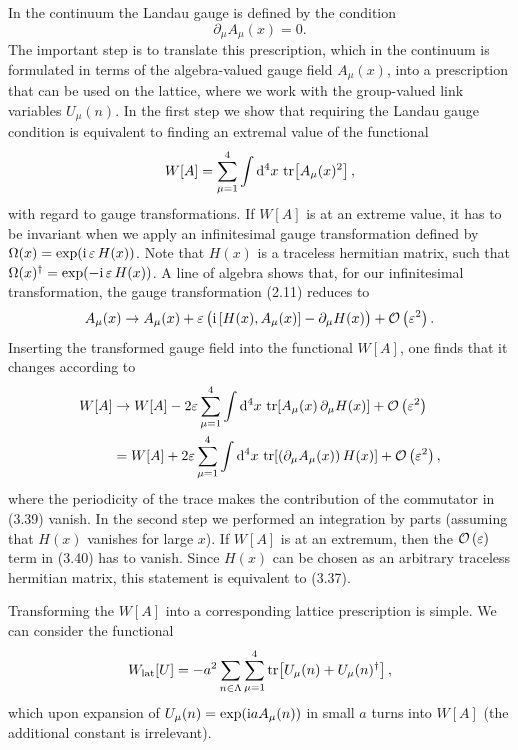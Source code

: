 In the continuum the Landau gauge is defined by the condition
\begin{equation}
  \partial_\mu A_\mu(x) = 0 .
\end{equation}
The important step is to translate this prescription, which in the continuum is
formulated in terms of the algebra-valued gauge field $A_\mu(x)$, into a
prescription that can be used on the lattice, where we work with the
group-valued link variables $U_\mu(n)$. In the first step we show that
requiring the Landau gauge condition is equivalent to finding an extremal value
of the functional
\begin{equation}
  W[A] = \sum_{\mu=1}^{4}\int \mathrm{d}^4 x\, \operatorname{tr}\!\left[A_\mu(x)^2\right] ,
\end{equation}
with regard to gauge transformations. If $W[A]$ is at an extreme value, it has
to be invariant when we apply an infinitesimal gauge transformation defined by
$\Omega(x) = \exp(\mathrm{i}\,\varepsilon\, H(x))$. Note that $H(x)$ is a traceless
hermitian matrix, such that $\Omega(x)^\dagger = \exp(-\mathrm{i}\,\varepsilon\,
H(x))$. A line of algebra shows that, for our infinitesimal transformation, the
gauge transformation (2.11) reduces to
\begin{equation}
  A_\mu(x) \to A_\mu(x) + \varepsilon\,\big(\mathrm{i}\,[H(x), A_\mu(x)] - \partial_\mu H(x)\big) + \mathcal{O}\left(\varepsilon^2\right) .
\end{equation}
Inserting the transformed gauge field into the functional $W[A]$, one finds
that it changes according to
\begin{equation}
\begin{split}
  W[A] &\to W[A] - 2\varepsilon\sum_{\mu=1}^{4}\int \mathrm{d}^4 x\,
    \operatorname{tr}\!\left[A_\mu(x)\,\partial_\mu H(x)\right] + \mathcal{O}\left(\varepsilon^2\right) \\
  &= W[A] + 2\varepsilon\sum_{\mu=1}^{4}\int \mathrm{d}^4 x\,
    \operatorname{tr}\!\left[(\partial_\mu A_\mu(x))\, H(x)\right] + \mathcal{O}\left(\varepsilon^2\right) ,
\end{split}
\end{equation}
where the periodicity of the trace makes the contribution of the commutator in
(3.39) vanish. In the second step we performed an integration by parts
(assuming that $H(x)$ vanishes for large $x$). If $W[A]$ is at an extremum, then
the $\mathcal{O}\left(\varepsilon\right)$ term in (3.40) has to vanish. Since $H(x)$ can be
chosen as an arbitrary traceless hermitian matrix, this statement is equivalent
to (3.37).

Transforming the $W[A]$ into a corresponding lattice prescription is simple. We
can consider the functional
\begin{equation}
  W_{\mathrm{lat}}[U] = -a^2\sum_{n\in\Lambda}\sum_{\mu=1}^{4}
    \operatorname{tr}\!\left[U_\mu(n) + U_\mu(n)^\dagger\right] ,
\end{equation}
which upon expansion of $U_\mu(n) = \exp(\mathrm{i} a A_\mu(n))$ in small $a$ turns
into $W[A]$ (the additional constant is irrelevant).

